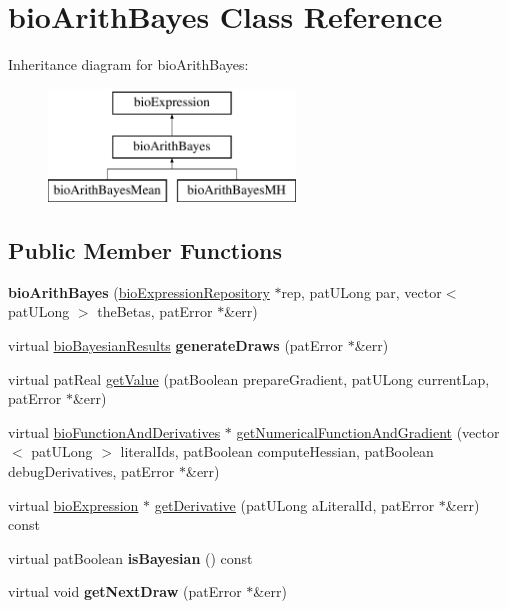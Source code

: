 \hypertarget{classbio_arith_bayes}{}\section{bio\+Arith\+Bayes Class Reference}
\label{classbio_arith_bayes}
Inheritance diagram for bio\+Arith\+Bayes\+:\begin{figure}[H]
\begin{center}
\leavevmode
\includegraphics[height=3.000000cm]{classbio_arith_bayes}
\end{center}
\end{figure}
\subsection*{Public Member Functions}
\begin{DoxyCompactItemize}
\item 
\mbox{\label{classbio_arith_bayes_aa832659e5def15ef3d64034ed2230421}} 
{\bfseries bio\+Arith\+Bayes} (\hyperlink{classbio_expression_repository}{bio\+Expression\+Repository} $\ast$rep, pat\+U\+Long par, vector$<$ pat\+U\+Long $>$ the\+Betas, pat\+Error $\ast$\&err)
\item 
\mbox{\label{classbio_arith_bayes_a43436619a30bb17a88eeea54e34031be}} 
virtual \hyperlink{classbio_bayesian_results}{bio\+Bayesian\+Results} {\bfseries generate\+Draws} (pat\+Error $\ast$\&err)
\item 
virtual pat\+Real \hyperlink{classbio_arith_bayes_a7292ae29cd04168543674b1ae71f4bed}{get\+Value} (pat\+Boolean prepare\+Gradient, pat\+U\+Long current\+Lap, pat\+Error $\ast$\&err)
\item 
virtual \hyperlink{classbio_function_and_derivatives}{bio\+Function\+And\+Derivatives} $\ast$ \hyperlink{classbio_arith_bayes_a3421312ddc6b7e0b080c497cdc53d1a5}{get\+Numerical\+Function\+And\+Gradient} (vector$<$ pat\+U\+Long $>$ literal\+Ids, pat\+Boolean compute\+Hessian, pat\+Boolean debug\+Derivatives, pat\+Error $\ast$\&err)
\item 
virtual \hyperlink{classbio_expression}{bio\+Expression} $\ast$ \hyperlink{classbio_arith_bayes_a53f5d22f6a5b743fbf50bd75db697ccd}{get\+Derivative} (pat\+U\+Long a\+Literal\+Id, pat\+Error $\ast$\&err) const
\item 
\mbox{\label{classbio_arith_bayes_a2fcca322e8e0001c5a19fbefd7b747d6}} 
virtual pat\+Boolean {\bfseries is\+Bayesian} () const
\item 
\mbox{\label{classbio_arith_bayes_a96e6336d69bd78f9251beca5a10640f4}} 
virtual void {\bfseries get\+Next\+Draw} (pat\+Error $\ast$\&err)
\end{DoxyCompactItemize}
